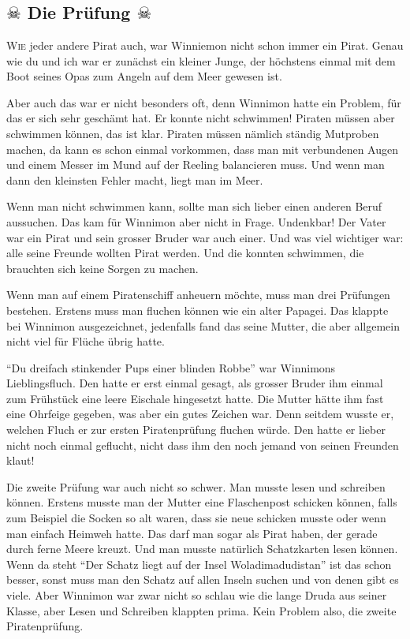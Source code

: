 \chapter*{}
\section*{\center $\skull$ Die Prüfung $\skull$}
\lettrine[lines=3]{\color{red}W}{ie} jeder andere Pirat auch, war Winniemon nicht schon immer ein Pirat. Genau wie du und ich war er zunächst ein kleiner Junge, der höchstens einmal mit dem Boot seines Opas zum Angeln auf dem Meer gewesen ist. 

Aber auch das war er nicht besonders oft, denn Winnimon hatte ein Problem, für das er sich sehr geschämt hat. Er konnte nicht schwimmen! Piraten müssen aber schwimmen können, das ist klar. Piraten müssen nämlich ständig Mutproben machen, da kann es schon einmal vorkommen, dass man mit verbundenen Augen und einem Messer im Mund auf der Reeling balancieren muss. Und wenn man dann den kleinsten Fehler macht, liegt man im Meer.

Wenn man nicht schwimmen kann, sollte man sich lieber einen anderen Beruf aussuchen. Das kam für Winnimon aber nicht in Frage. Undenkbar! Der Vater war ein Pirat und sein grosser Bruder war auch einer. Und was viel wichtiger war: alle seine Freunde wollten Pirat werden. Und die konnten schwimmen, die brauchten sich keine Sorgen zu machen.

Wenn man auf einem Piratenschiff anheuern möchte, muss man drei Prüfungen bestehen. Erstens muss man fluchen können wie ein alter Papagei. Das klappte bei Winnimon ausgezeichnet, jedenfalls fand das seine Mutter, die aber allgemein nicht viel für Flüche übrig hatte. 

\enquote{Du dreifach stinkender Pups einer blinden Robbe} war Winnimons Lieblingsfluch. Den hatte er erst einmal gesagt, als grosser Bruder ihm einmal zum Frühstück eine leere Eischale hingesetzt hatte. Die Mutter hätte ihm fast eine Ohrfeige gegeben, was aber ein gutes Zeichen war. Denn seitdem wusste er, welchen Fluch er zur ersten Piratenprüfung fluchen würde. Den hatte er lieber nicht noch einmal geflucht, nicht dass ihm den noch jemand von seinen Freunden klaut!

Die zweite Prüfung war auch nicht so schwer. Man musste lesen und schreiben können. Erstens musste man der Mutter eine Flaschenpost schicken können, falls zum Beispiel die Socken so alt waren, dass sie neue schicken musste oder wenn man einfach Heimweh hatte. Das darf man sogar als Pirat haben, der gerade durch ferne Meere kreuzt. Und man musste natürlich Schatzkarten lesen können. Wenn da steht \enquote{Der Schatz liegt auf der Insel Woladimadudistan} ist das schon besser, sonst muss man den Schatz auf allen Inseln suchen und von denen gibt es viele. Aber Winnimon war zwar nicht so schlau wie die lange Druda aus seiner Klasse, aber Lesen und Schreiben klappten prima. Kein Problem also, die zweite Piratenprüfung.

